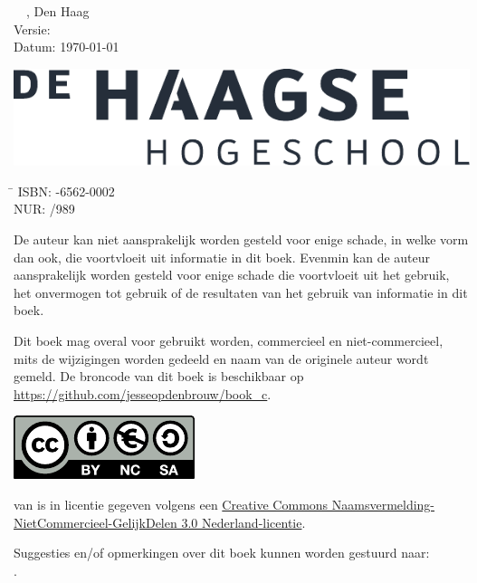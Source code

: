 \maketitle

\hspace*{0em}
\vfill
\textcopyright\the\year\ \ \bookauthor, Den Haag\\
Versie: \bookversion\\
Datum: \today

\vspace*{.25cm}
\ifusebookasbook\else
\includegraphics[scale=0.5]{images/HHS_NL_grijs_FC}
\fi

\ifusebookasbook
\vspace*{1cm}
\begin{tabbing}
\hspace{1.2cm}\=\kill
 ISBN: -6562-0002 \\ 
 NUR:  /989
\end{tabbing}
\fi

\vspace*{1cm}
De auteur kan niet aansprakelijk worden gesteld voor enige schade, in welke vorm dan
ook, die voortvloeit uit informatie in dit boek. Evenmin kan de auteur aansprakelijk
worden gesteld voor enige schade die voortvloeit uit het gebruik, het onvermogen tot
gebruik of de resultaten van het gebruik van informatie in dit boek.

\vspace*{0.5cm}
Dit boek mag overal voor gebruikt worden, commercieel en niet-commercieel, mits de
wijzigingen worden gedeeld en naam van de originele auteur wordt gemeld. De broncode
van dit boek is beschikbaar op \url{https://github.com/jesseopdenbrouw/book_c}.


\vspace*{2cm}
\includegraphics{images/by-nc-sa_eu.pdf}
\par
{\small%
\booktitle{} van \bookauthor{} is in licentie gegeven volgens
een \href{http://creativecommons.org/licenses/by-nc-sa/3.0/nl/}{Creative Commons
Naamsvermelding-NietCommercieel-GelijkDelen 3.0 Nederland-licentie}.

Suggesties en/of opmerkingen over dit boek kunnen worden gestuurd naar:\\
\href{mailto:\email}{\email}.}
